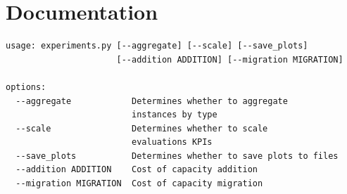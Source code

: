 \section{Documentation} \label{sec:attachments/documentation}

\begin{small}
\begin{verbatim}
usage: experiments.py [--aggregate] [--scale] [--save_plots]
                      [--addition ADDITION] [--migration MIGRATION]
                                                                                                               
options:                                                                                                       
  --aggregate            Determines whether to aggregate
                         instances by type                                      
  --scale                Determines whether to scale
                         evaluations KPIs                                           
  --save_plots           Determines whether to save plots to files                                              
  --addition ADDITION    Cost of capacity addition                                                              
  --migration MIGRATION  Cost of capacity migration
\end{verbatim}
\end{small}


